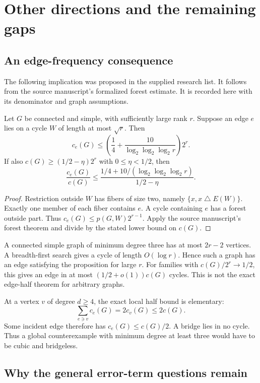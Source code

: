 \section{Other directions and the remaining gaps}\label{sec:remaining}

\subsection{An edge-frequency consequence}

The following implication was proposed in the supplied research list.
It follows from the source manuscript's formalized forest estimate.
It is recorded here with its denominator and graph assumptions.

\begin{proposition}\label{prop:research-edge}
Let $G$ be connected and simple, with sufficiently large rank $r$.
Suppose an edge $e$ lies on a cycle $W$ of length at most $\sqrt r$.
Then
\[
 c_e(G)\le\left(\frac14+\frac{10}{\log_2\log_2\log_2 r}\right)2^r.
\]
If also $c(G)\ge(1/2-\eta)2^r$ with $0\le\eta<1/2$, then
\[
 \frac{c_e(G)}{c(G)}
 \le\frac{1/4+10/(\log_2\log_2\log_2 r)}{1/2-\eta}.
\]
\end{proposition}

\begin{proof}
Restriction outside $W$ has fibers of size two, namely $\{x,x\mathbin\triangle E(W)\}$.
Exactly one member of each fiber contains $e$.
A cycle containing $e$ has a forest outside part.
Thus $c_e(G)\le p(G,W)2^{r-1}$.
Apply the source manuscript's forest theorem and divide by the stated lower bound on $c(G)$.
\end{proof}

A connected simple graph of minimum degree three has at most $2r-2$ vertices.
A breadth-first search gives a cycle of length $O(\log r)$.
Hence such a graph has an edge satisfying the proposition for large $r$.
For families with $c(G)/2^r\to1/2$, this gives an edge in at most $(1/2+o(1))c(G)$ cycles.
This is not the exact edge-half theorem for arbitrary graphs.

At a vertex $v$ of degree $d\ge4$, the exact local half bound is elementary:
\[
 \sum_{e\ni v}c_e(G)=2c_v(G)\le2c(G).
\]
Some incident edge therefore has $c_e(G)\le c(G)/2$.
A bridge lies in no cycle.
Thus a global counterexample with minimum degree at least three would have to be cubic and bridgeless.

\subsection{Why the general error-term questions remain}

